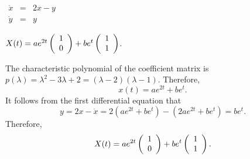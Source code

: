 \documentclass{ximera}
\begin{document}
\begin{exercise} \label{c12.3.4d}
$\begin{array}{rcl}
\dot{x} & = & 2x-y\\
\dot{y} & = & y
\end{array}$

\begin{solution}
\ans $X(t) = ae^{2t}\left(\begin{array}{r} 1 \\ 0\end{array}\right) + be^t\left(\begin{array}{r} 1 \\ 1\end{array}\right)$.

\soln  The characteristic polynomial of the coefficient matrix is 
$p(\lambda) = \lambda^2-3\lambda+2=(\lambda-2)(\lambda-1)$.  Therefore, 
\[
x(t) = ae^{2t}+be^t.
\]
It follows from the first differential equation that 
\[
y = 2x-\dot{x} = 2(ae^{2t}+be^t)-(2ae^{2t}+be^t) = be^t.
\]
Therefore,
\[
X(t) = ae^{2t}\left(\begin{array}{r} 1 \\ 0\end{array}\right) + be^t\left(\begin{array}{r} 1 \\ 1\end{array}\right).
\]


\end{solution}
\end{exercise}
\end{document}
